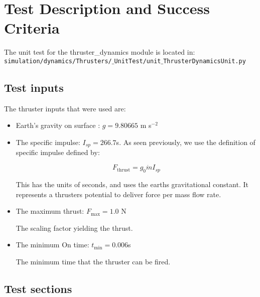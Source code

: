 \section{Test Description and Success Criteria}

The unit test for the thruster\_dynamics module is located in:\\

\noindent
{\tt simulation/dynamics/Thrusters/$\_$UnitTest/unit$\_$ThrusterDynamicsUnit.py} \\

\subsection{Test inputs}

The thruster inputs that were used are:

\begin{itemize}
\item Earth's gravity on surface : $g=9.80665$ m s$^{-2}$ 
\item The specific impulse: $I_{sp} = 266.7$s. As seen previously, we use the definition of specific impulse defined by:

\begin{equation*}
F_{\mathrm{thrust}} = g_0 \dot{m} I_{sp}
\end{equation*}

This has the units of seconds, and uses the earths gravitational constant. It represents a thrusters potential to deliver force per mass flow rate. 
\item The maximum thrust: $F_{\mathrm{max}} = 1.0$ N

The scaling factor yielding the thrust.
\item The minimum On time: $t_{\mathrm{min}} = 0.006$s

The minimum time that the thruster can be fired.
\end{itemize}

\subsection{Test sections}

